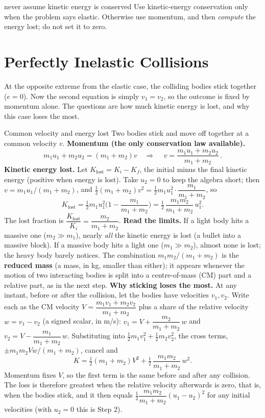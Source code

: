 \begin{trapbox}{never assume kinetic energy is conserved}
Use kinetic-energy conservation only when the problem says elastic. Otherwise use momentum, and then
\emph{compute} the energy lost; do not set it to zero.
\end{trapbox}

\section{Perfectly Inelastic Collisions}\label{sec:inelastic12}

At the opposite extreme from the elastic case, the colliding bodies stick together ($e=0$). Now the
second equation is simply $v_1=v_2$, so the outcome is fixed by momentum alone. The questions are how
much kinetic energy is lost, and why this case loses the most.

\begin{derivbox}{Common velocity and energy lost}
Two bodies stick and move off together at a common velocity $v$.
 \textbf{Momentum (the only conservation law available).}
\[
m_1u_1+m_2u_2=(m_1+m_2)v\quad\Longrightarrow\quad
\boxed{\,v=\dfrac{m_1u_1+m_2u_2}{m_1+m_2}\,}.
\]
 \textbf{Kinetic energy lost.} Let $K_{\text{lost}}=K_i-K_f$, the initial minus the final
kinetic energy (positive when energy is lost). Take $u_2=0$ to keep the algebra short; then
$v=m_1u_1/(m_1+m_2)$, and $\tfrac12(m_1+m_2)v^2=\tfrac12 m_1u_1^2\cdot\dfrac{m_1}{m_1+m_2}$, so
\[
K_{\text{lost}}=\tfrac12 m_1u_1^2\Big(1-\frac{m_1}{m_1+m_2}\Big)
=\tfrac12\,\frac{m_1 m_2}{m_1+m_2}\,u_1^2.
\]
The lost fraction is $\dfrac{K_{\text{lost}}}{K_i}=\dfrac{m_2}{m_1+m_2}$.
 \textbf{Read the limits.} If a light body hits a massive one ($m_2\gg m_1$), nearly \emph{all}
the kinetic energy is lost (a bullet into a massive block). If a massive body hits a light one
($m_1\gg m_2$), almost none is lost; the heavy body barely notices. The combination
$m_1m_2/(m_1+m_2)$ is the \textbf{reduced mass} (a mass, in \si{kg}, smaller than either); it appears
whenever the motion of two interacting bodies is split into a centre-of-mass (CM) part and a relative
part, as in the next step.
 \textbf{Why sticking loses the most.} At any instant, before or after the collision, let the
bodies have velocities $v_1,v_2$. Write each as the CM velocity $V=\dfrac{m_1v_1+m_2v_2}{m_1+m_2}$ plus a
share of the relative velocity $w=v_1-v_2$ (a signed scalar, in \si{m/s}):
$v_1=V+\dfrac{m_2}{m_1+m_2}\,w$ and $v_2=V-\dfrac{m_1}{m_1+m_2}\,w$. Substituting into
$\tfrac12m_1v_1^2+\tfrac12m_2v_2^2$, the cross terms, $\pm m_1m_2Vw/(m_1+m_2)$, cancel and
\[
K=\tfrac12(m_1+m_2)V^2+\tfrac12\,\frac{m_1m_2}{m_1+m_2}\,w^2.
\]
Momentum fixes $V$, so the first term is the same before and after any collision. The loss is therefore
greatest when the relative velocity afterwards is zero, that is, when the bodies stick, and it then equals
$\tfrac12\dfrac{m_1m_2}{m_1+m_2}(u_1-u_2)^2$ for any initial velocities (with $u_2=0$ this is Step 2).
\end{derivbox}

